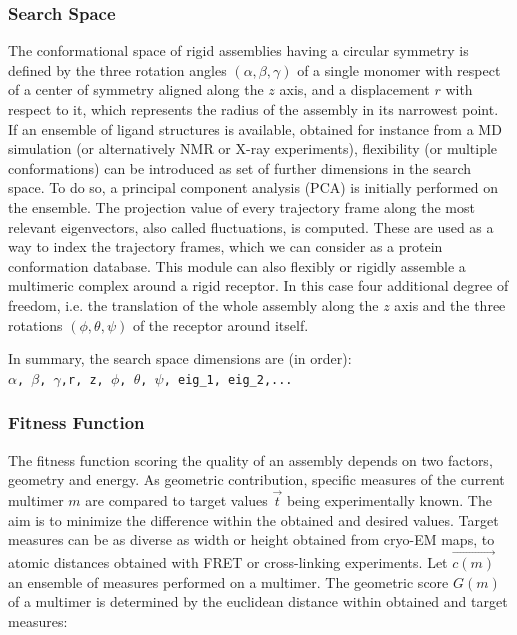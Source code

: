 \documentclass[a4paper, 12pt]{article}
\begin{document}
\subsubsection{Search Space\label{size}}

The conformational space of rigid assemblies having a circular symmetry is defined by the three rotation angles $(\alpha,\beta,\gamma)$ of a single monomer with respect of a center of symmetry aligned along the $z$ axis, and a displacement $r$ with respect to it, which represents the radius of the assembly in its narrowest point. If an ensemble of ligand structures is available, obtained for instance from a MD simulation (or alternatively NMR or X-ray experiments), flexibility (or multiple conformations) can be introduced as set of further dimensions in the search space. To do so, a principal component analysis (PCA) is initially performed on the ensemble. The projection value of every trajectory frame along the most relevant eigenvectors, also called fluctuations, is computed. These are used as a way to index the trajectory frames, which we can consider as a protein conformation database. This module can also flexibly or rigidly assemble a multimeric complex around a rigid receptor. In this case four additional degree of freedom, i.e. the translation of the whole assembly along the $z$ axis and the three rotations  $(\phi,\theta,\psi)$ of the receptor around itself.

In summary, the search space dimensions are (in order):\\
\texttt{$\alpha$, $\beta$, $\gamma$,r, z, $\phi$, $\theta$, $\psi$, eig\_1, eig\_2,...}\\

\subsubsection{Fitness Function}

The fitness function scoring the quality of an assembly depends on two factors, geometry and energy. As geometric contribution, specific measures of the current multimer $m$ are compared to target values $\vec{t}$ being experimentally known. The aim is to minimize the difference within the obtained and desired values. Target measures can be as diverse as  width or height obtained from cryo-EM maps, to atomic distances obtained with FRET or cross-linking experiments. Let $\vec{c(m)}$  an ensemble of measures performed on a multimer. The geometric score $G(m)$ of a multimer is determined by the euclidean distance within obtained and target measures:
\end{document}
